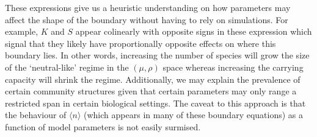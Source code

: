 \documentclass[9pt,twocolumn,twoside,lineno]{pnas-new}
\begin{document}
These expressions give us a heuristic understanding on how parameters may affect the shape of the boundary without having to rely on simulations.
For example, $K$ and $S$ appear colinearly with opposite signs in these expression which signal that they likely have proportionally opposite effects on where this boundary lies.
In other words, increasing the number of species will grow the size of the `neutral-like' regime in the $(\mu,\rho)$ space whereas increasing the carrying capacity will shrink the regime.
Additionally, we may explain the prevalence of certain community structures given that certain parameters may only range a restricted span in certain biological settings. 
The caveat to this approach is that the behaviour of $\langle n \rangle$ (which appears in many of these boundary equations) as a function of model parameters is not easily surmised. 


\end{document}
